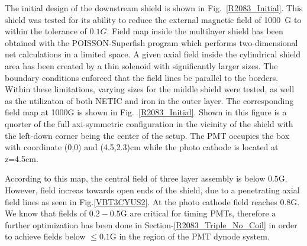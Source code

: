 \documentclass[12pt]{article}
\begin{document}
The initial design of  the  downstream  shield  is 
shown  in Fig.~\ref{R2083_Initial}.
 This shield  was  tested for its ability to reduce the external 
magnetic field of 1000~G to 
within the tolerance of $0.1G$.
Field map inside the multilayer shield has been  obtained with 
the POISSON-Superfish  program  which performs two-dimensional net calculations 
in a limited space.  A given  axial field inside the cylindrical shield  area   has been
created by a thin solenoid with  significantly larger sizes.
The boundary conditions enforced that the field lines be parallel to
the borders. 
Within these limitations, varying sizes for the middle shield were tested, as well
as the utilizaton of both NETIC and iron in the outer layer.
The corresponding field map at 1000G is  shown  in Fig.~\ref{R2083_Initial}. 
%
Shown in this figure is a quorter of the full axi-symmetric configuration in the vicinity of the shield   
with the left-down corner being the center of the setup. 
The PMT  occupies the box with coordinate (0,0) and (4.5,2.3)cm  while the  photo cathode is located at  z=4.5cm. 

According to this map, the central  field  of three layer assembly  is  below $0.5$G. 
However,  field  increas towards   open ends of the shield, 
due to a penetrating  axial field lines as seen in Fig.\ref{VBT3CYUS2}.
 At the photo cathode field  reaches  $0.8$G.
We know that  fields  of $0.2-0.5$G are  critical  for  timing PMTs, 
therefore a further optimization has been done in 
Section-\ref{R2083_Triple_No_Coil} in order to achieve fields
 below $\leq0.1$G in the region of the PMT dynode system.











\end{document}
